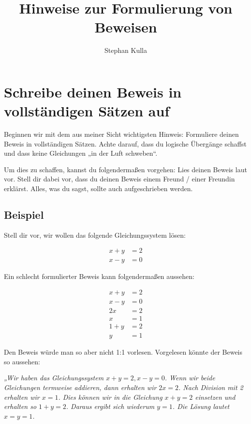 \documentclass[a4paper]{article}
\title{Hinweise zur Formulierung von Beweisen}
\author{Stephan Kulla}
\begin{document}
\maketitle

\section{Schreibe deinen Beweis in vollständigen Sätzen auf}

Beginnen wir mit dem aus meiner Sicht wichtigsten Hinweis: Formuliere deinen Beweis in vollständigen Sätzen. Achte darauf, dass du logische Übergänge schaffst und dass keine Gleichungen „in der Luft schweben“.

Um dies zu schaffen, kannst du folgendermaßen vorgehen: Lies deinen Beweis laut vor. Stell dir dabei vor, dass du deinen Beweis einem Freund / einer Freundin erklärst. Alles, was du sagst, sollte auch aufgeschrieben werden.

\subsection{Beispiel}

Stell dir vor, wir wollen das folgende Gleichungssystem lösen:

\begin{align}
  x+y &= 2 \\
  x-y &= 0
\end{align}

Ein schlecht formulierter Beweis kann folgendermaßen aussehen:

\begin{align}
  x+y &= 2 \\
  x-y &= 0 \\
  2x &= 2 \\
  x&=1 \\
  1+y&=2 \\
  y&=1
\end{align}

Den Beweis würde man so aber nicht 1:1 vorlesen. Vorgelesen könnte der Beweis so aussehen:

\begin{addmargin}{2cm}
  \emph{„Wir haben das Gleichungssystem $x+y=2, x-y=0$. Wenn wir beide Gleichungen termweise addieren, dann erhalten wir $2x=2$. Nach Division mit 2 erhalten wir $x=1$. Dies können wir in die Gleichung $x+y=2$ einsetzen und erhalten so $1+y=2$. Daraus ergibt sich wiederum $y=1$. Die Lösung lautet $x=y=1$.}
\end{addmargin}
\end{document}
